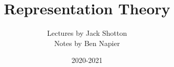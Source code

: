 

\title{Representation Theory}
\author{Lectures by Jack Shotton \\ Notes by Ben Napier}
\date{2020-2021}




\maketitle
\tableofcontents





